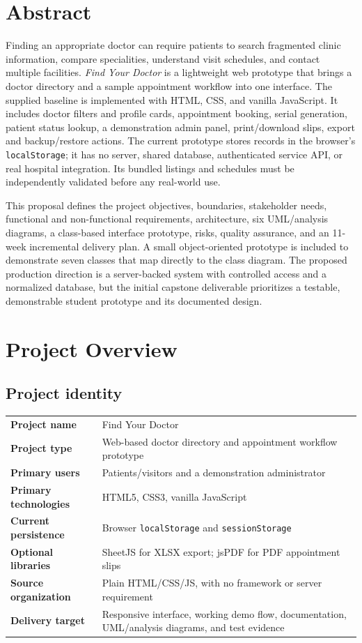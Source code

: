 \documentclass[11pt,a4paper]{article}
\begin{document}
\section*{Abstract}
Finding an appropriate doctor can require patients to search fragmented clinic information, compare specialities, understand visit schedules, and contact multiple facilities. \textit{Find Your Doctor} is a lightweight web prototype that brings a doctor directory and a sample appointment workflow into one interface. The supplied baseline is implemented with HTML, CSS, and vanilla JavaScript. It includes doctor filters and profile cards, appointment booking, serial generation, patient status lookup, a demonstration admin panel, print/download slips, export and backup/restore actions. The current prototype stores records in the browser's \texttt{localStorage}; it has no server, shared database, authenticated service API, or real hospital integration. Its bundled listings and schedules must be independently validated before any real-world use.

This proposal defines the project objectives, boundaries, stakeholder needs, functional and non-functional requirements, architecture, six UML/analysis diagrams, a class-based interface prototype, risks, quality assurance, and an 11-week incremental delivery plan. A small object-oriented prototype is included to demonstrate seven classes that map directly to the class diagram. The proposed production direction is a server-backed system with controlled access and a normalized database, but the initial capstone deliverable prioritizes a testable, demonstrable student prototype and its documented design.


\tableofcontents
\clearpage
{}

\section{Project Overview}
\subsection{Project identity}
\begin{tabularx}{\textwidth}{>{\bfseries}p{4.0cm}X}
Project name & Find Your Doctor\\
Project type & Web-based doctor directory and appointment workflow prototype\\
Primary users & Patients/visitors and a demonstration administrator\\
Primary technologies & HTML5, CSS3, vanilla JavaScript\\
Current persistence & Browser \texttt{localStorage} and \texttt{sessionStorage}\\
Optional libraries & SheetJS for XLSX export; jsPDF for PDF appointment slips\\
Source organization & Plain HTML/CSS/JS, with no framework or server requirement\\
Delivery target & Responsive interface, working demo flow, documentation, UML/analysis diagrams, and test evidence\\
\end{tabularx}
\end{document}
